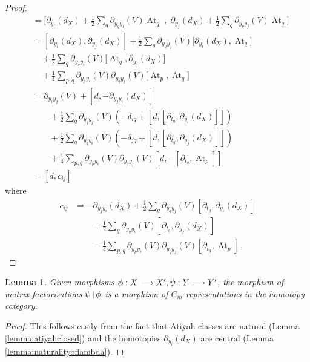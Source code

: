 \documentclass[english,letter paper,12pt,leqno]{article}
\newtheorem{lemma}[theorem]{Lemma}
\theoremstyle{example}
\numberwithin{equation}{section}
\DeclareMathOperator{\At}{At}
\begin{document}
\begin{proof}
\begin{align*}
[ \gamma_i, \gamma_j ] &= \Big[ \partial_{y_i}(d_X) + \frac{1}{2} \sum_q \partial_{y_q y_i}(V) \At_{q}\; , \; \partial_{y_j}(d_X) + \frac{1}{2} \sum_q \partial_{y_q y_j}(V) \At_{q} \Big]\\
&= [ \partial_{y_i}(d_X), \partial_{y_j}(d_X) ] + \frac{1}{2}\sum_q \partial_{y_qy_j}(V) \big[ \partial_{y_i}(d_X), \At_q \big]\\
&\quad + \frac{1}{2}\sum_q \partial_{y_q y_i}(V) \big[ \At_q, \partial_{y_j}(d_X) \big]\\
&\quad + \frac{1}{4}\sum_{p,q} \partial_{y_py_i}(V) \partial_{y_qy_j}(V) \big[ \At_p, \At_q \big]\\
&= \partial_{y_iy_j}(V) + [d, - \partial_{y_jy_i}(d_X)]\\
&\qquad + \frac{1}{2}\sum_q \partial_{y_qy_j}(V) \left( -\delta_{iq} + [d, [ \partial_{t_q}, \partial_{y_i}(d_X)]] \right)\\
&\qquad + \frac{1}{2} \sum_q \partial_{y_qy_i}(V) \left( -\delta_{jq} + [d, [\partial_{t_q}, \partial_{y_j}(d_X)]] \right)\\
&\qquad + \frac{1}{4}\sum_{p,q} \partial_{y_py_i}(V) \partial_{y_qy_j}(V) [d, -[\partial_{t_q}, \At_p]]\\
&= [d, c_{ij}]
\end{align*}
where
\begin{align*}
c_{ij} &= - \partial_{y_jy_i}(d_X) + \frac{1}{2} \sum_q \partial_{y_qy_j}(V)  [\partial_{t_q}, \partial_{y_i}(d_X)]\\
&\qquad + \frac{1}{2} \sum_q \partial_{y_qy_i}(V) [\partial_{t_q}, \partial_{y_j}(d_X)]\\
&\qquad - \frac{1}{4} \sum_{p,q}  \partial_{y_py_i}(V) \partial_{y_qy_j}(V)  [\partial_{t_q}, \At_p]\,.
\end{align*}
\end{proof}

\begin{lemma}\label{prop:morphismsarecliffordreps} Given morphisms $\phi: X \longrightarrow X', \psi: Y \longrightarrow Y'$, the morphism of matrix factorisations $\psi \,|\, \phi$ is a morphism of $C_m$-representations in the homotopy category.
\end{lemma}
\begin{proof}
This follows easily from the fact that Atiyah classes are natural (Lemma \ref{lemma:atiyahclosed}) and the homotopies $\partial_{y_i}(d_X)$ are central (Lemma \ref{lemma:naturalityoflambda}).
\end{proof}
\end{document}
